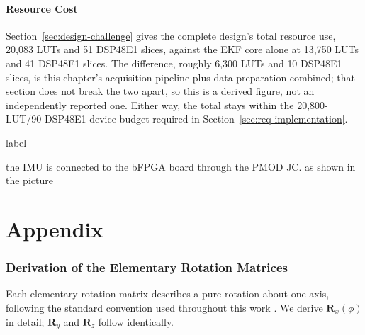 \documentclass[12pt,a4paper]{article}
\begin{document}
{%
\subsection{Resource Cost}
\label{sec:impl-resource-cost}

Section~\ref{sec:design-challenge} gives the complete design's total
resource use, 20{,}083 LUTs and 51 DSP48E1 slices, against the EKF core
alone at 13{,}750 LUTs and 41 DSP48E1 slices. The difference, roughly
6{,}300 LUTs and 10 DSP48E1 slices, is this chapter's acquisition
pipeline plus data preparation combined; that section does not break
the two apart, so this is a derived figure, not an independently
reported one. Either way, the total stays within the
20{,}800-LUT/90-DSP48E1 device budget required in
Section~\ref{sec:req-implementation}.



label

the IMU is connected to the bFPGA board through the PMOD JC. as shown in the picture


\newpage
\newpage
\clearpage
{}
\part*{Appendix}


\appendix

\section{Derivation of the Elementary Rotation Matrices}
\label{app:rotation}
Each elementary rotation matrix describes a pure rotation about one axis,
following the standard convention used throughout this work
\citep{groves2013principles}. We derive $\bm{R}_x(\phi)$ in detail; $\bm{R}_y$
and $\bm{R}_z$ follow identically.

}
\end{document}

